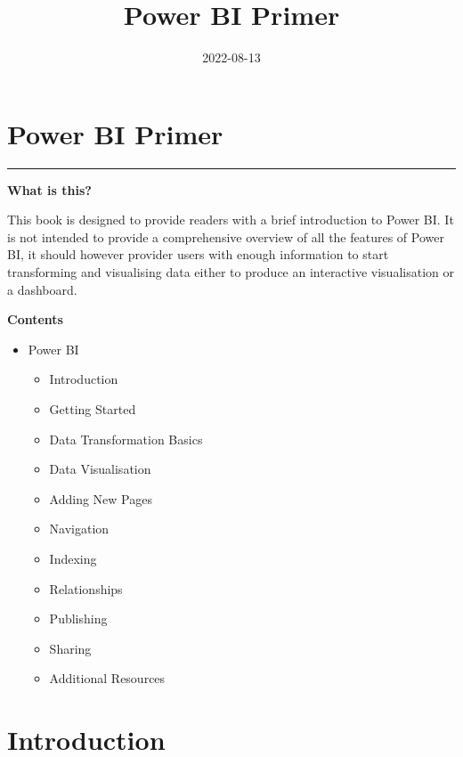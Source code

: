 \documentclass[
]{book}
\title{Power BI Primer}
\author{}
\date{\vspace{-2.5em}2022-08-13}
\providecommand{\tightlist}{%
  \setlength{\itemsep}{0pt}\setlength{\parskip}{0pt}}
\begin{document}
\maketitle

{
\setcounter{tocdepth}{1}
\tableofcontents
}
\hypertarget{Power-BI-Primer}{%
\chapter*{Power BI Primer}\label{Power-BI-Primer}}

\begin{center}\rule{0.5\linewidth}{0.5pt}\end{center}

\textbf{What is this?}

This book is designed to provide readers with a brief introduction to Power BI. It is not intended to provide a comprehensive overview of all the features of Power BI, it should however provider users with enough information to start transforming and visualising data either to produce an interactive visualisation or a dashboard.

\textbf{Contents}

\begin{itemize}
\tightlist
\item
  Power BI

  \begin{itemize}
  \tightlist
  \item
    Introduction
  \item
    Getting Started
  \item
    Data Transformation Basics
  \item
    Data Visualisation
  \item
    Adding New Pages
  \item
    Navigation
  \item
    Indexing
  \item
    Relationships
  \item
    Publishing
  \item
    Sharing
  \item
    Additional Resources
  \end{itemize}
\end{itemize}

\hypertarget{intro}{%
\chapter{Introduction}\label{intro}}
\end{document}
